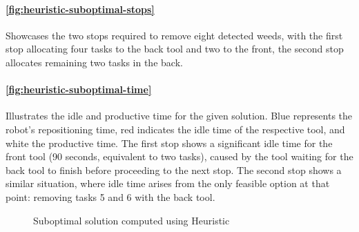 \paragraph{\autoref{fig:heuristic-suboptimal-stops}} Showcases the two stops required to remove eight detected weeds, with the first stop allocating four tasks to the back tool and two to the front, the second stop allocates remaining two tasks in the back.

\paragraph{\autoref{fig:heuristic-suboptimal-time}} Illustrates the idle and productive time for the given solution. Blue represents the robot’s repositioning time, red indicates the idle time of the respective tool, and white the productive time. The first stop shows a significant idle time for the front tool (90 seconds, equivalent to two tasks), caused by the tool waiting for the back tool to finish before proceeding to the next stop. The second stop shows a similar situation, where idle time arises from the only feasible option at that point: removing tasks 5 and 6 with the back tool.

\begin{figure}[htb]
    \myfloatalign


    \caption{Suboptimal solution computed using Heuristic}
    \label{fig:heuristics-suboptimal}
\end{figure}

